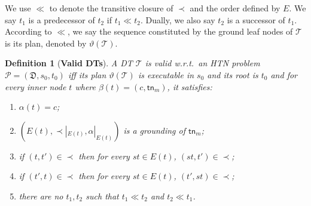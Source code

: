 \documentclass[letterpaper]{article} %
\newtheorem{definition}{Definition}
\newcommand{\Operators}{\mathcal{O}}
\newcommand{\Cactions}{\mathcal{C}}
\newcommand{\Cname}{\Cactions}
\newcommand{\HtnDomain}{\mathfrak{D}}
\newcommand{\Methods}{\mathcal{M}}
\newcommand{\Method}{\Methods}
\newcommand{\HtnProblem}{\mathcal{P}}
\newcommand{\Constraint}{\prec}
\newcommand{\Constraints}{\Constraint}
\newcommand{\ctop}{t_I}
\newcommand{\tn}{\mathsf{tn}}
\newcommand{\nil}{\mathsf{nil}}
\newcommand{\firstsubtask}{*t}
\newcommand{\lastsubtask}{t*}
\newcommand{\Dtree}{\mathcal{T}}
\newcommand{\ch}{\mathsf{ch}}
\newcommand{\sub}{\mathsf{sub}}
\newcommand{\Tasksof}{T}
\newcommand{\yield}{\vartheta}
\newcommand{\aspprec}{\ll}
\newcommand{\BEF}{\mathsf{B}}
\newcommand{\AFT}{\mathsf{A}}
\begin{document}
We use $\aspprec$ to denote the transitive closure of $\Constraints$ and the order defined by $E$. We say $t_1$ is a predecessor of $t_2$ if $t_1 \aspprec t_2$.
Dually, we also say $t_2$ is a successor of $t_1$.
According to $\aspprec$, we say the sequence constituted by the ground leaf nodes of $\Dtree$ is its plan, denoted by $\yield(\Dtree)$.

\begin{definition}[\textbf{Valid DTs}]\label{def_valid_decomp_tree}
A DT $\Dtree$ is valid \emph{w.r.t.}\ an HTN problem %
$\HtnProblem = (\HtnDomain,s_0,t_0)$
iff its plan $\yield(\Dtree)$ is executable in $s_0$ and
its root is $t_0$ %
and for every inner node $t$ where $\beta(t)=(c,\tn_m)$, it satisfies:
\begin{enumerate}
  \item $\alpha(t)=c$;
  \item %
  $(E(t),\Constraints\!|_{E(t)},\alpha |_{E(t)})$ is a grounding of $\tn_m$;
  \item if $(t, t')\in \Constraints$ then for every $st \in E(t)$, $(st,t') \in \Constraints$; %
  \item if $(t', t)\in \Constraints$ then for every $st \in E(t)$, $(t', st) \in \Constraints$; %
  \item there are no $t_1,t_2$ such that $t_1 \aspprec t_2$ and $t_2 \aspprec t_1$.
\end{enumerate}
\end{definition}
\end{document}
